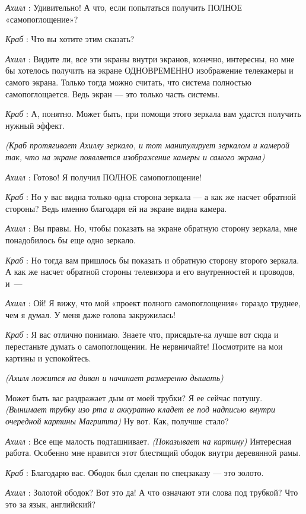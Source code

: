 \documentclass[../main.tex]{subfiles}
\begin{document}
\begin{dialogue}
\emph{Ахилл} : Удивительно! А что, если попытаться получить ПОЛНОЕ «самопоглощение»?

\emph{Краб} : Что вы хотите этим сказать?

\emph{Ахилл} : Видите ли, все эти экраны внутри экранов, конечно, интересны, но мне бы хотелось получить на экране ОДНОВРЕМЕННО изображение телекамеры и самого экрана. Только тогда можно считать, что система полностью самопоглощается. Ведь экран --- это только часть системы.

\emph{Краб} : А, понятно. Может быть, при помощи этого зеркала вам удастся получить нужный эффект.

\emph{(Краб протягивает Ахиллу зеркало, и тот манипулирует зеркалом и камерой так, что на экране появляется изображение камеры и самого экрана)}

\emph{Ахилл} : Готово! Я получил ПОЛНОЕ самопоглощение!

\emph{Краб} : Но у вас видна только одна сторона зеркала --- а как же насчет обратной стороны? Ведь именно благодаря ей на экране видна камера.

\emph{Ахилл} : Вы правы. Но, чтобы показать на экране обратную сторону зеркала, мне понадобилось бы еще одно зеркало.

\emph{Краб} : Но тогда вам пришлось бы показать и обратную сторону второго зеркала. А как же насчет обратной стороны телевизора и его внутренностей и проводов, и~---

\emph{Ахилл} : Ой! Я вижу, что мой «проект полного самопоглощения» гораздо труднее, чем я думал. У меня даже голова закружилась!

\emph{Краб} : Я вас отлично понимаю. Знаете что, присядьте-ка лучше вот сюда и перестаньте думать о самопоглощении. Не нервничайте! Посмотрите на мои картины и успокойтесь.

\emph{(Ахилл ложится на диван и начинает размеренно дышать)}

Может быть вас раздражает дым от моей трубки? Я ее сейчас потушу. \emph{(Вынимает трубку изо рта и аккуратно кладет ее под надписью внутри очередной картины Магритта)} Ну вот. Как, получше стало?

\emph{Ахилл} : Все еще малость подташнивает. \emph{(Показывает на картину)} Интересная работа. Особенно мне нравится этот блестящий ободок внутри деревянной рамы.

\emph{Краб} : Благодарю вас. Ободок был сделан по спецзаказу --- это золото.

\emph{Ахилл} : Золотой ободок? Вот это да! А что означают эти слова под трубкой? Что это за язык, английский?


\end{dialogue}
\end{document}
